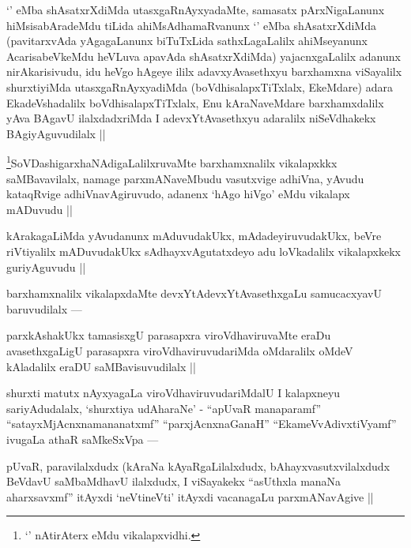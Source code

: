 
\begin{artha}
`\stext' eMba shAsatxrXdiMda utasxgaRnAyxyadaMte, samasatx pArxNigaLanunx hiMsisabAradeMdu tiLida ahiMsAdhamaRvanunx `\stext' eMba shAsatxrXdiMda (pavitarxvAda yAgagaLanunx biTuTxLida sathxLagaLalilx ahiMseyanunx AcarisabeVkeMdu heVLuva apavAda shAsatxrXdiMda) yajacnxgaLalilx adanunx nirAkarisivudu, idu heVgo hAgeye ililx adavxyAvasethxyu barxhamxna viSayalilx shurxtiyiMda utasxgaRnAyxyadiMda (boVdhisalapxTiTxlalx, EkeMdare) adara EkadeVshadalilx boVdhisalapxTiTxlalx, Enu kAraNaveMdare barxhamxdalilx yAva BAgavU ilalxdadxriMda I adevxYtAvasethxyu adaralilx niSeVdhakekx BAgiyAguvudilalx ||
\end{artha}


\begin{artha}
\footnote{`\stext' nAtirAterx eMdu vikalapxvidhi.}SoVDashigarxhaNAdigaLalilxruvaMte barxhamxnalilx vikalapxkkx saMBavavilalx, namage parxmANaveMbudu vasutxvige adhiVna, yAvudu kataqRvige adhiVnavAgiruvudo, adanenx `hAgo hiVgo' eMdu vikalapx mADuvudu ||
\end{artha}

\begin{artha}
kArakagaLiMda yAvudanunx mAduvudakUkx, mAdadeyiruvudakUkx, beVre riVtiyalilx mADuvudakUkx sAdhayxvAgutatxdeyo adu loVkadalilx vikalapxkekx guriyAguvudu ||
\end{artha}

\begin{artha}
barxhamxnalilx vikalapxdaMte devxYtAdevxYtAvasethxgaLu samucacxyavU baruvudilalx ---
\end{artha}

\begin{artha}
parxkAshakUkx tamasisxgU parasapxra viroVdhaviruvaMte eraDu avasethxgaLigU parasapxra viroVdhaviruvudariMda oMdaralilx oMdeV kAladalilx eraDU saMBavisuvudilalx ||
\end{artha}

\begin{artha}
shurxti matutx nAyxyagaLa viroVdhaviruvudariMdalU I kalapxneyu sariyAdudalalx, `shurxtiya udAharaNe' - ``apUvaR manaparamf'' ``satayxMjAcnxnamananatxmf'' ``parxjAcnxnaGanaH'' ``EkameVvAdivxtiVyamf'' ivugaLa athaR saMkeSxVpa ---
\end{artha}

\begin{artha}
pUvaR, paravilalxdudx (kAraNa kAyaRgaLilalxdudx, bAhayxvasutxvilalxdudx BeVdavU saMbaMdhavU ilalxdudx, I viSayakekx ``asUthxla manaNa aharxsavxmf'' itAyxdi `neVtineVti' itAyxdi vacanagaLu parxmANavAgive ||
\end{artha}

